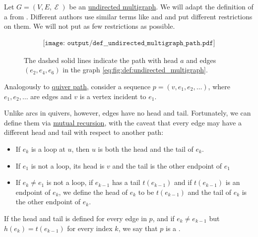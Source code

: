 \begin{definition}\label{def:undirected_multigraph_path}
  Let \( G = (V, E, \mscrE) \) be an \hyperref[def:undirected_multigraph]{undirected multigraph}. We will adapt the definition of a  from . Different authors use similar terms like  and  and put different restrictions on them. We will not put as few restrictions as possible.

  \begin{figure}
    \begin{equation}\label{eq:fig:def:undirected_multigraph_path}
      \begin{aligned}
        \texttt{[image: output/def\_\_undirected\_multigraph\_path.pdf]}
      \end{aligned}
    \end{equation}
    \caption{The dashed solid lines indicate the path with head \( a \) and edges \( (e_2, e_4, e_6) \) in the graph \eqref{eq:fig:def:undirected_multigraph}.}\label{fig:def:undirected_multigraph_path}
  \end{figure}

  Analogously to \hyperref[def:quiver_path]{quiver path}, consider a sequence \( p = (v, e_1, e_2, \ldots) \), where \( e_1, e_2, \ldots \) are edges and \( v \) is a vertex incident to \( e_1 \).

  Unlike arcs in quivers, however, edges have no head and tail. Fortunately, we can define them via \hyperref[thm:structural_recursion]{mutual recursion}, with the caveat that every edge may have a different head and tail with respect to another path:
  \begin{itemize}
    \item If \( e_k \) is a loop at \( u \), then \( u \) is both the head and the tail of \( e_k \).
    \item If \( e_1 \) is not a loop, its head is \( v \) and the tail is the other endpoint of \( e_1 \)
    \item If \( e_k \neq e_1 \) is not a loop, if \( e_{k-1} \) has a tail \( t(e_{k-1}) \) and if \( t(e_{k-1}) \) is an endpoint of \( e_k \), we define the head of \( e_k \) to be \( t(e_{k-1}) \) and the tail of \( e_k \) is the other endpoint of \( e_k \).
  \end{itemize}

  If the head and tail is defined for every edge in \( p \), and if \( e_k \neq e_{k-1} \) but \( h(e_k) = t(e_{k-1}) \) for every index \( k \), we say that \( p \) is a .


\end{definition}
